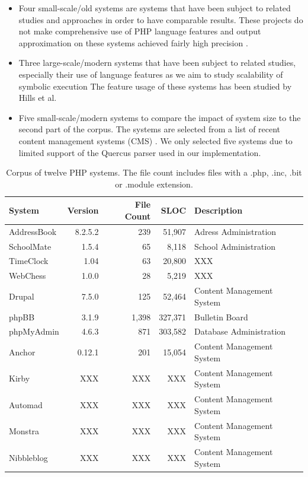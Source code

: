 \documentclass{sig-alternate-05-2015}
\begin{document}
\begin{itemize}
  \item Four small-scale/old systems are systems that have been subject to
  related studies and approaches in order to have comparable results. These
  projects do not make comprehensive use of PHP language features and output
  approximation on these systems achieved fairly high precision
  \cite{minamide2005static,Nguyen:2014:BCG:2635868.2635928}.
  
  \item Three large-scale/modern systems that have been subject to related
  studies, especially their use of language features as we aim to study
  scalability of symbolic execution The feature usage of these systems has been
  studied by Hills et al. \cite{Hills:2013:ESP:2483760.2483786}
  
  \item Five small-scale/modern systems to compare the impact
  of system size to the second part of the corpus. The systems are selected
  from a list of recent content management systems (CMS) \cite{codegeekz}. We only selected five systems 	due to limited support of the Quercus parser used in our implementation.
\end{itemize}

\begin{table}[t]
\centering 
	\begin{tabular}{p{4cm}rrrl}
	\toprule
	\textbf{System} & \textbf{Version} & \textbf{File Count} & \textbf{SLOC} &
	\textbf{Description}
	\\
	\midrule
	AddressBook & 8.2.5.2 & 239 & 51,907 & Adress Administration \\
	SchoolMate & 1.5.4 & 65 & 8,118 & School Administration \\
	TimeClock & 1.04 & 63 & 20,800 & XXX \\
	WebChess & 1.0.0 & 28 & 5,219 & XXX \\
	\midrule
	Drupal & 7.5.0 & 125 & 52,464 & Content Management System \\
	phpBB & 3.1.9 & 1,398 & 327,371 & Bulletin Board \\
	phpMyAdmin & 4.6.3 & 871 & 303,582 & Database Administration \\
	\midrule
	Anchor & 0.12.1 & 201 & 15,054 & Content Management System \\
	Kirby & XXX & XXX & XXX & Content Management System \\
	Automad & XXX & XXX & XXX & Content Management System \\
	Monstra & XXX & XXX & XXX & Content Management System \\
	Nibbleblog & XXX & XXX & XXX & Content Management System \\
	\bottomrule
	\end{tabular}
	\caption{Corpus of twelve PHP systems. The file count includes files with a .php,
	.inc, .bit or .module extension.}
	\label{corpus}
\end{table}
\end{document}
